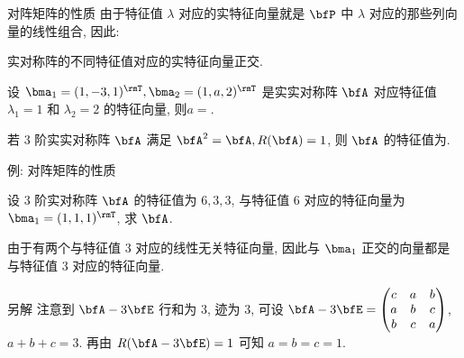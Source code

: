 \begin{frame}{对阵矩阵的性质}
	\onslide<+->
	由于特征值 $\lambda$ 对应的实特征向量就是 $\bfP$ 中 $\lambda$ 对应的那些列向量的线性组合,
	\onslide<+->
	因此:
	\begin{corollary}
		实对称阵的不同特征值对应的实特征向量正交.
	\end{corollary}
	\onslide<+->
	\begin{exercise}
		设 $\bma_1=(1,-3,1)^\rmT,\bma_2=(1,a,2)^\rmT$ 是实实对称阵 $\bfA$ 对应特征值 $\lambda_1=1$ 和 $\lambda_2=2$ 的特征向量, 则$a=$.
	\end{exercise}
	\onslide<+->
	\begin{exercise}
		若 $3$ 阶实实对称阵 $\bfA$ 满足 $\bfA^2=\bfA, R(\bfA)=1$, 则 $\bfA$ 的特征值为\fillblankframe[2cm]{$0,0,1$}.
	\end{exercise}
\end{frame}


\begin{frame}{例: 对阵矩阵的性质}\small
\beqskip{5pt}
	\onslide<+->
	\begin{example}
		设 $3$ 阶实对称阵 $\bfA$ 的特征值为 $6,3,3$, 与特征值 $6$ 对应的特征向量为 $\bma_1=(1,1,1)^\rmT$, 求 $\bfA$. 
	\end{example}
	\onslide<+->
	\begin{solution}
		由于有两个与特征值 $3$ 对应的线性无关特征向量, 因此与 $\bma_1$ 正交的向量都是与特征值 $3$ 对应的特征向量.
		\vspace{-.5\baselineskip}
	\end{solution}
	\onslide<+->
	\begin{solution}{另解}
		注意到 $\bfA-3\bfE$ 行和为 $3$, 迹为 $3$, 可设 $\bfA-3\bfE=\begin{pmatrix}
			c&a&b\\
			a&b&c\\
			b&c&a
		\end{pmatrix}$, $a+b+c=3$. 再由 $R(\bfA-3\bfE)=1$ 可知 $a=b=c=1$.
	\end{solution}
\endgroup
\end{frame}


